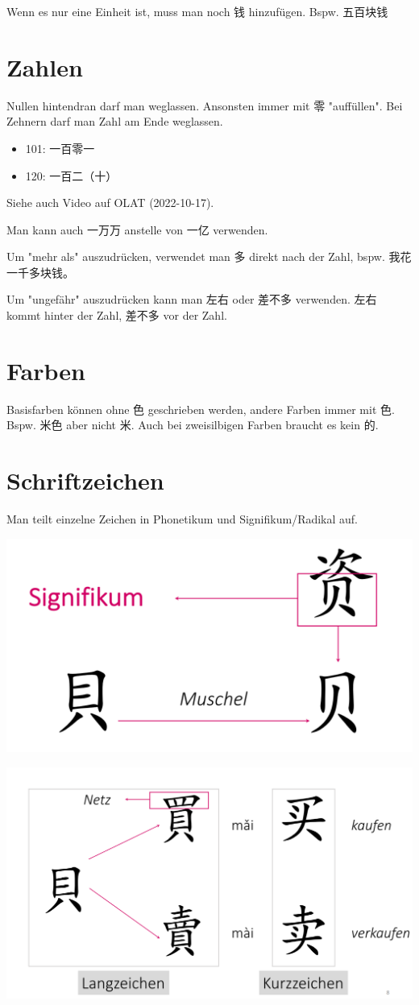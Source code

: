 \documentclass[UTF8]{ctexart}
\begin{document}
Wenn es nur eine Einheit ist, muss man noch 钱 hinzufügen. Bspw. 五百块钱

\section{Zahlen}

Nullen hintendran darf man weglassen. Ansonsten immer mit 零 "auffüllen". Bei Zehnern darf man Zahl am Ende weglassen.

\begin{itemize}
    \item 101: 一百零一
    \item 120: 一百二（十）
\end{itemize}

Siehe auch Video auf OLAT (2022-10-17).

Man kann auch 一万万 anstelle von 一亿 verwenden.

Um "mehr als" auszudrücken, verwendet man 多 direkt nach der Zahl, bspw. 我花一千多块钱。

Um "ungefähr" auszudrücken kann man 左右 oder 差不多 verwenden. 左右 kommt hinter der Zahl, 差不多 vor der Zahl.

\section{Farben}

Basisfarben können ohne 色 geschrieben werden, andere Farben immer mit 色. Bspw. 米色 aber nicht 米. Auch bei zweisilbigen Farben braucht es kein 的.

\section{Schriftzeichen}

Man teilt einzelne Zeichen in Phonetikum und Signifikum/Radikal auf.

\includegraphics[width=\linewidth]{signifikum.png}

\includegraphics[width=\linewidth]{mai.png}
\end{document}
